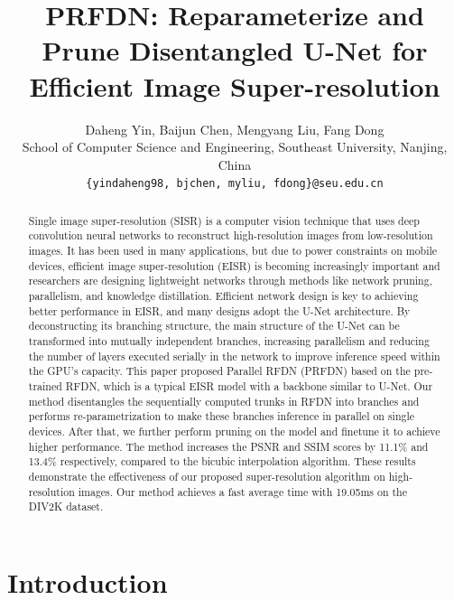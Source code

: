 \documentclass[10pt,twocolumn,letterpaper]{article}
\begin{document}
\title{PRFDN: Reparameterize and Prune Disentangled U-Net for Efficient Image Super-resolution}

\author{Daheng Yin, Baijun Chen, Mengyang Liu, Fang Dong\\
School of Computer Science and Engineering, Southeast University, Nanjing, China\\
{\tt\small \{yindaheng98, bjchen, myliu, fdong\}@seu.edu.cn}
}
\maketitle

\begin{abstract}
  Single image super-resolution (SISR) is a computer vision technique that uses deep convolution neural networks to reconstruct high-resolution images from low-resolution images. It has been used in many applications, but due to power constraints on mobile devices, efficient image super-resolution (EISR) is becoming increasingly important and researchers are designing lightweight networks through methods like network pruning, parallelism, and knowledge distillation.
  Efficient network design is key to achieving better performance in EISR, and many designs adopt the U-Net architecture. By deconstructing its branching structure, the main structure of the U-Net can be transformed into mutually independent branches, increasing parallelism and reducing the number of layers executed serially in the network to improve inference speed within the GPU's capacity.
  This paper proposed Parallel RFDN (PRFDN) based on the pre-trained RFDN, which is a typical EISR model with a backbone similar to U-Net. 
  Our method disentangles the sequentially computed trunks in RFDN into branches and performs re-parametrization to make these branches inference in parallel on single devices. 
  After that, we further perform pruning on the model and finetune it to achieve higher performance. The method increases the PSNR and SSIM scores by 11.1\% and 13.4\% respectively, compared to the bicubic interpolation algorithm. These results demonstrate the effectiveness of our proposed super-resolution algorithm on high-resolution images. Our method achieves a fast average time with 19.05ms on the DIV2K dataset.
\end{abstract}

\section{Introduction}
\label{sec:intro}
\end{document}
